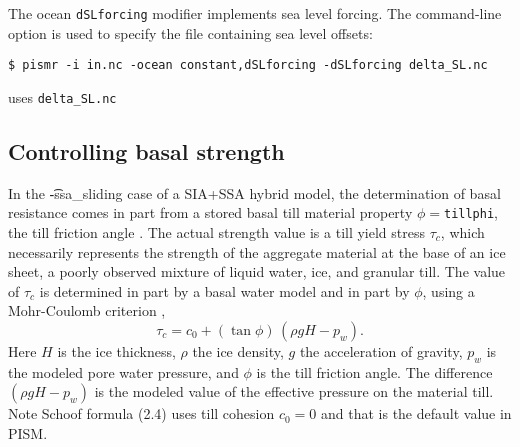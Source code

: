   The ocean \texttt{dSLforcing} modifier implements sea level forcing. The command-line option  is used to specify the file containing sea level offsets:
\begin{verbatim}
$ pismr -i in.nc -ocean constant,dSLforcing -dSLforcing delta_SL.nc
\end{verbatim}%
uses \texttt{delta_SL.nc}

\subsection{Controlling basal strength}  \label{subsect:basestrength}

In the \t{-ssa_sliding} case of a SIA+SSA hybrid model, the determination of basal resistance comes in part from a stored basal till material property $\phi=$\texttt{tillphi}, the till friction angle \cite{Paterson}.  The actual strength value is a till yield stress $\tau_c$, which necessarily represents the strength of the aggregate material at the base of an ice sheet, a poorly observed mixture of liquid water, ice, and granular till.  The value of $\tau_c$ is determined in part by a basal water model and in part by $\phi$, using a Mohr-Coulomb criterion \cite[Chapter 8]{Paterson}, 
\begin{equation*}
   \tau_c = c_{0} + (\tan\phi)\,(\rho g H - p_w).
\end{equation*}
Here $H$ is the ice thickness, $\rho$ the ice density, $g$ the acceleration of gravity, $p_w$ is the modeled pore water pressure, and $\phi$ is the till friction angle.  The difference $(\rho g H - p_w)$ is the modeled value of the effective pressure on the material till.  Note Schoof \cite{SchoofStream} formula (2.4) uses till cohesion $c_0 = 0$ and that is the default value in PISM.

